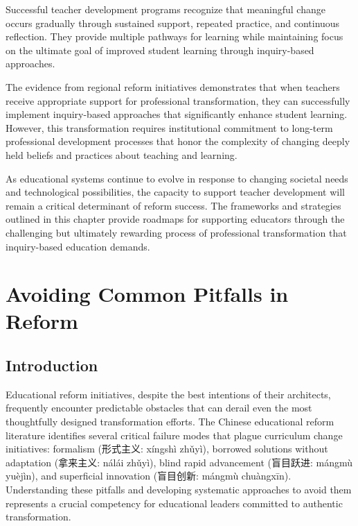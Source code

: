 \documentclass[
  Letterpaper,
]{scrbook}
\begin{document}
Successful teacher development programs recognize that meaningful change
occurs gradually through sustained support, repeated practice, and
continuous reflection. They provide multiple pathways for learning while
maintaining focus on the ultimate goal of improved student learning
through inquiry-based approaches.

The evidence from regional reform initiatives demonstrates that when
teachers receive appropriate support for professional transformation,
they can successfully implement inquiry-based approaches that
significantly enhance student learning. However, this transformation
requires institutional commitment to long-term professional development
processes that honor the complexity of changing deeply held beliefs and
practices about teaching and learning.

As educational systems continue to evolve in response to changing
societal needs and technological possibilities, the capacity to support
teacher development will remain a critical determinant of reform
success. The frameworks and strategies outlined in this chapter provide
roadmaps for supporting educators through the challenging but ultimately
rewarding process of professional transformation that inquiry-based
education demands.


\chapter{Avoiding Common Pitfalls in
Reform}\label{avoiding-common-pitfalls-in-reform}

\section{Introduction}\label{introduction-6}

Educational reform initiatives, despite the best intentions of their
architects, frequently encounter predictable obstacles that can derail
even the most thoughtfully designed transformation efforts. The Chinese
educational reform literature identifies several critical failure modes
that plague curriculum change initiatives: formalism (形式主义: xíngshì
zhǔyì), borrowed solutions without adaptation (拿来主义: nálái zhǔyì),
blind rapid advancement (盲目跃进: mángmù yuèjìn), and superficial
innovation (盲目创新: mángmù chuàngxīn). Understanding these pitfalls
and developing systematic approaches to avoid them represents a crucial
competency for educational leaders committed to authentic
transformation.
\end{document}
